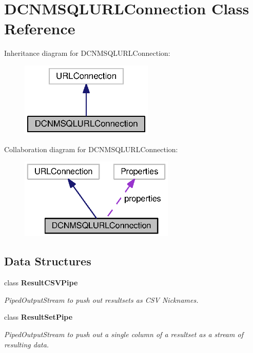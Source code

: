 \section{D\+C\+N\+M\+S\+Q\+L\+U\+R\+L\+Connection Class Reference}
\label{classorg_1_1smallfoot_1_1parser_1_1dcnmsql_1_1DCNMSQLURLConnection}


Inheritance diagram for D\+C\+N\+M\+S\+Q\+L\+U\+R\+L\+Connection\+:
\nopagebreak
\begin{figure}[H]
\begin{center}
\leavevmode
\includegraphics[width=180pt]{classorg_1_1smallfoot_1_1parser_1_1dcnmsql_1_1DCNMSQLURLConnection__inherit__graph}
\end{center}
\end{figure}


Collaboration diagram for D\+C\+N\+M\+S\+Q\+L\+U\+R\+L\+Connection\+:
\nopagebreak
\begin{figure}[H]
\begin{center}
\leavevmode
\includegraphics[width=209pt]{classorg_1_1smallfoot_1_1parser_1_1dcnmsql_1_1DCNMSQLURLConnection__coll__graph}
\end{center}
\end{figure}
\subsection*{Data Structures}
\begin{DoxyCompactItemize}
\item 
class {\bfseries Result\+C\+S\+V\+Pipe}
\begin{DoxyCompactList}\small\item\em Piped\+Output\+Stream to push out resultsets as C\+S\+V Nicknames. \end{DoxyCompactList}\item 
class {\bfseries Result\+Set\+Pipe}
\begin{DoxyCompactList}\small\item\em Piped\+Output\+Stream to push out a single column of a resultset as a stream of resulting data. \end{DoxyCompactList}\end{DoxyCompactItemize}
